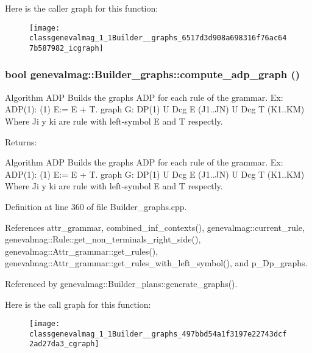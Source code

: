 Here is the caller graph for this function:\nopagebreak
\begin{figure}[H]
\begin{center}
\leavevmode
\texttt{[image: classgenevalmag\_1\_1Builder\_\_graphs\_6517d3d908a698316f76ac647b587982\_icgraph]}
\end{center}
\end{figure}
\hypertarget{classgenevalmag_1_1Builder__graphs_497bbd54a1f3197e22743dcf2ad27da3}{
\subsubsection[{compute\_\-adp\_\-graph}]{\setlength{\rightskip}{0pt plus 5cm}bool genevalmag::Builder\_\-graphs::compute\_\-adp\_\-graph ()}}
\label{classgenevalmag_1_1Builder__graphs_497bbd54a1f3197e22743dcf2ad27da3}


Algorithm ADP Builds the graphs ADP for each rule of the grammar. Ex: ADP(1): (1) E:= E + T. graph G: DP(1) U Dcg E (J1..JN) U Dcg T (K1..KM) Where Ji y ki are rule with left-symbol E and T respectly. \begin{Desc}
\item[Returns:]\end{Desc}
Algorithm ADP Builds the graphs ADP for each rule of the grammar. Ex: ADP(1): (1) E:= E + T. graph G: DP(1) U Dcg E (J1..JN) U Dcg T (K1..KM) Where Ji y ki are rule with left-symbol E and T respectly. 

Definition at line 360 of file Builder\_\-graphs.cpp.

References attr\_\-grammar, combined\_\-inf\_\-contexts(), genevalmag::current\_\-rule, genevalmag::Rule::get\_\-non\_\-terminals\_\-right\_\-side(), genevalmag::Attr\_\-grammar::get\_\-rules(), genevalmag::Attr\_\-grammar::get\_\-rules\_\-with\_\-left\_\-symbol(), and p\_\-Dp\_\-graphs.

Referenced by genevalmag::Builder\_\-plans::generate\_\-graphs().

Here is the call graph for this function:\nopagebreak
\begin{figure}[H]
\begin{center}
\leavevmode
\texttt{[image: classgenevalmag\_1\_1Builder\_\_graphs\_497bbd54a1f3197e22743dcf2ad27da3\_cgraph]}
\end{center}
\end{figure}


